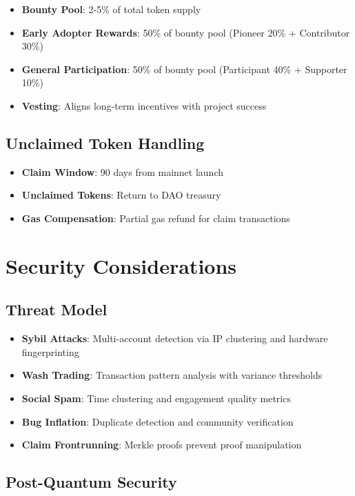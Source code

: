 \documentclass[11pt,a4paper]{article}
\begin{document}
\begin{itemize}
    \item \textbf{Bounty Pool}: 2-5\% of total token supply
    \item \textbf{Early Adopter Rewards}: 50\% of bounty pool (Pioneer 20\% + Contributor 30\%)
    \item \textbf{General Participation}: 50\% of bounty pool (Participant 40\% + Supporter 10\%)
    \item \textbf{Vesting}: Aligns long-term incentives with project success
\end{itemize}

\subsection{Unclaimed Token Handling}

\begin{itemize}
    \item \textbf{Claim Window}: 90 days from mainnet launch
    \item \textbf{Unclaimed Tokens}: Return to DAO treasury
    \item \textbf{Gas Compensation}: Partial gas refund for claim transactions
\end{itemize}

\section{Security Considerations}

\subsection{Threat Model}

\begin{itemize}
    \item \textbf{Sybil Attacks}: Multi-account detection via IP clustering and hardware fingerprinting
    \item \textbf{Wash Trading}: Transaction pattern analysis with variance thresholds
    \item \textbf{Social Spam}: Time clustering and engagement quality metrics
    \item \textbf{Bug Inflation}: Duplicate detection and community verification
    \item \textbf{Claim Frontrunning}: Merkle proofs prevent proof manipulation
\end{itemize}

\subsection{Post-Quantum Security}
\end{document}

